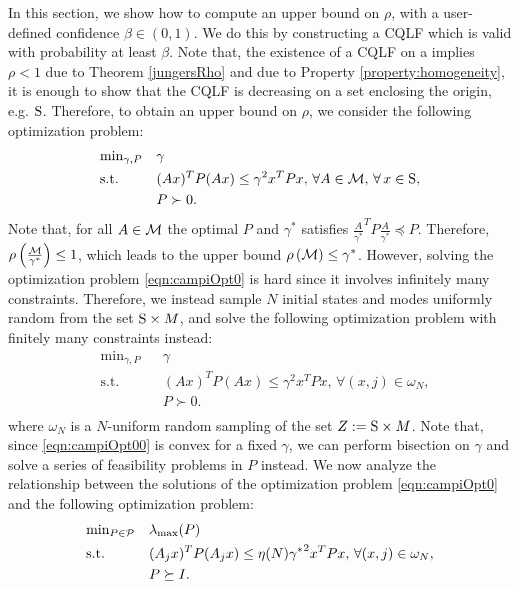 In this section, we show how to compute an upper bound on $\rho$, with a user-defined confidence $\beta \in (0, 1)$. We do this by constructing a CQLF which is valid with probability at least $\beta$. Note that, the existence of a CQLF on a implies $\rho < 1$ due to Theorem \ref{jungersRho} and due to Property \ref{property:homogeneity}, it is enough to show that the CQLF is decreasing on a set enclosing the origin, e.g. $\text{S}$. Therefore, to obtain an upper bound on $\rho$, we consider the following optimization problem:
\begin{equation}\label{eqn:campiOpt0}
\begin{aligned}
& \text{min}_{\gamma, P} & & \gamma \\
& \text{s.t.} 
&  & (Ax)^TP(Ax) \leq \gamma^2 x^TPx,\,\forall A \in \mathcal{M}, \,\forall\, x \in \text{S},\\
& && P \succ 0. \\
\end{aligned}
\end{equation}
Note that, for all $A \in \mathcal{M}$ the optimal $P$ and $\gamma^*$ satisfies $\frac{A}{\gamma^*}^TP\frac{A}{\gamma^*} \preceq P$. Therefore, $\rho\left(\frac{\mathcal{M}}{\gamma^*}\right) \leq 1$, which leads to the upper bound $\rho\left(\mathcal{M} \right) \leq \gamma^*$. However, solving the optimization problem \eqref{eqn:campiOpt0} is hard since it involves infinitely many constraints. Therefore, we instead sample $N$ initial states and modes uniformly random from the set $\text{S} \times M$, and solve the following optimization problem with finitely many constraints instead:
\begin{equation}\label{eqn:campiOpt00}
\begin{aligned}
& \text{min}_{\gamma, P} & & \gamma \\
& \text{s.t.} 
&  & (Ax)^TP(Ax) \leq \gamma^2 x^TPx,\,\forall (x, j) \in \omega_N,\\
& && P \succ 0. \\
\end{aligned}
\end{equation}
where $\omega_N$ is a $N$-uniform random sampling of the set \mbox{$Z:=\text{S} \times M$}.
Note that, since \eqref{eqn:campiOpt00} is convex for a fixed $\gamma$, we can perform bisection on $\gamma$ and solve a series of feasibility problems in $P$ instead. We now analyze the relationship between the solutions of the optimization problem \eqref{eqn:campiOpt0} and the following optimization problem:
\begin{equation}\label{eqn:campiOpt01}
\begin{aligned}
& \text{min}_{P \in \mathcal{P}} & & \lambda_{\max}(P) \\
& \text{s.t.} 
&  & (A_j x)^TP(A_j x) \leq {\eta(N) \gamma^*}^2 x^TPx,\,\forall (x, j) \in \omega_N, \\
& && P \succeq I. \\
\end{aligned}
\end{equation}
